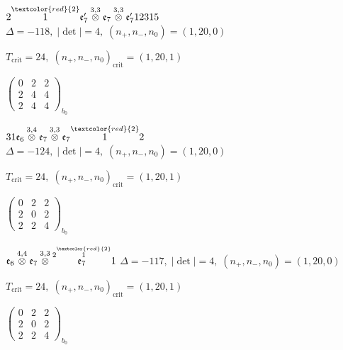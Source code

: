 \documentclass[10pt]{article}
\begin{document}
\smallskip

$2\overset{\textcolor{red}{2}}{1}\mathfrak{e}_7'\overset{3,3}{\otimes}\mathfrak{e}_7\overset{3,3}{\otimes}\mathfrak{e}_7'12315$ \quad $\Delta=-118,\; |\det|=4,\; (n_+,n_-,n_0)=(1,20,0)$

\hspace{1em}$T_{\text{crit}}=24,\; (n_+,n_-,n_0)_{\text{crit}}=(1,20,1)$

\hspace{2em}$\left(\begin{smallmatrix}0 & 2 & 2 \\ 2 & 4 & 4 \\ 2 & 4 & 4\end{smallmatrix}\right)_{\!b_0}$

\smallskip

$31\mathfrak{e}_6\overset{3,4}{\otimes}\mathfrak{e}_7\overset{3,3}{\otimes}\mathfrak{e}_7\overset{\textcolor{red}{2}}{1}2$ \quad $\Delta=-124,\; |\det|=4,\; (n_+,n_-,n_0)=(1,20,0)$

\hspace{1em}$T_{\text{crit}}=24,\; (n_+,n_-,n_0)_{\text{crit}}=(1,20,1)$

\hspace{2em}$\left(\begin{smallmatrix}0 & 2 & 2 \\ 2 & 0 & 2 \\ 2 & 2 & 4\end{smallmatrix}\right)_{\!b_0}$

\smallskip

$\mathfrak{e}_6\overset{4,4}{\otimes}\mathfrak{e}_7\overset{3,3}{\otimes}\overset{2\overset{\textcolor{red}{2}}{1}}{\mathfrak{e}_7}1$ \quad $\Delta=-117,\; |\det|=4,\; (n_+,n_-,n_0)=(1,20,0)$

\hspace{1em}$T_{\text{crit}}=24,\; (n_+,n_-,n_0)_{\text{crit}}=(1,20,1)$

\hspace{2em}$\left(\begin{smallmatrix}0 & 2 & 2 \\ 2 & 0 & 2 \\ 2 & 2 & 4\end{smallmatrix}\right)_{\!b_0}$
\end{document}
